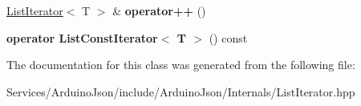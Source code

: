 \begin{DoxyCompactItemize}
\item 
\hypertarget{class_arduino_json_1_1_internals_1_1_list_iterator_af60629257f949bdc0371f0c55b948045}{}\hyperlink{class_arduino_json_1_1_internals_1_1_list_iterator}{List\+Iterator}$<$ T $>$ \& {\bfseries operator++} ()\label{class_arduino_json_1_1_internals_1_1_list_iterator_af60629257f949bdc0371f0c55b948045}

\item 
\hypertarget{class_arduino_json_1_1_internals_1_1_list_iterator_a54e20f29652d9d98fe7d848510fe2652}{}{\bfseries operator List\+Const\+Iterator$<$ T $>$} () const \label{class_arduino_json_1_1_internals_1_1_list_iterator_a54e20f29652d9d98fe7d848510fe2652}

\end{DoxyCompactItemize}


The documentation for this class was generated from the following file\+:\begin{DoxyCompactItemize}
\item 
Services/\+Arduino\+Json/include/\+Arduino\+Json/\+Internals/List\+Iterator.\+hpp\end{DoxyCompactItemize}
